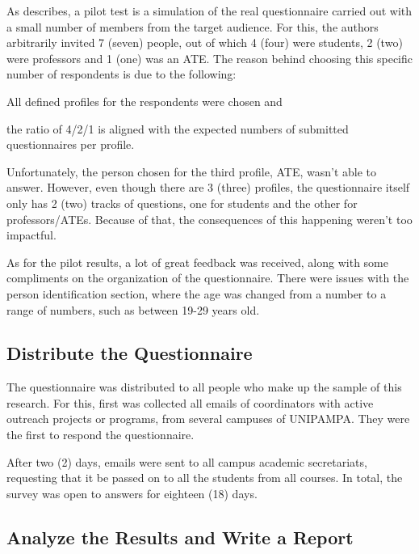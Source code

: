 As \textcite{kasunic2005designing} describes, a pilot test is a simulation of the real questionnaire carried out with a small number of members from the target audience. For this, the authors arbitrarily invited 7 (seven) people, out of which 4 (four) were students, 2 (two) were professors and 1 (one) was an \ac{ATE}. The reason behind choosing this specific number of respondents is due to the following:
\begin{inparaenum}[(i)]
  \item All defined profiles for the respondents were chosen and
  \item the ratio of 4/2/1 is aligned with the expected numbers of submitted questionnaires per profile.
\end{inparaenum}

Unfortunately, the person chosen for the third profile, \ac{ATE}, wasn't able to answer. However, even though there are 3 (three) profiles, the questionnaire itself only has 2 (two) tracks of questions, one for students and the other for professors/\acp{ATE}. Because of that, the consequences of this happening weren't too impactful.

As for the pilot results, a lot of great feedback was received, along with some compliments on the organization of the questionnaire. There were issues with the person identification section, where the age was changed from a number to a range of numbers, such as between 19-29 years old.

\subsection{Distribute the Questionnaire}\label{sec:survey-distribute}

The questionnaire was distributed to all people who make up the sample of this research. For this, first was collected all emails of coordinators with active outreach projects or programs, from several campuses of \ac{UNIPAMPA}. They were the first to respond the questionnaire.

After two (2) days, emails were sent to all campus academic secretariats, requesting that it be passed on to all the students from all courses. In total, the survey was open to answers for eighteen (18) days.

\subsection{Analyze the Results and Write a Report}\label{sec:survey-analyse}

